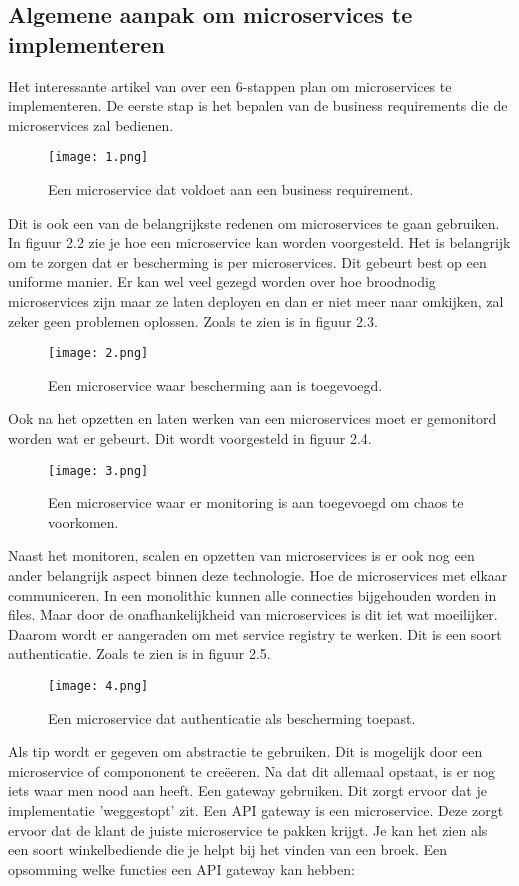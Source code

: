 \subsection{Algemene aanpak om microservices te implementeren}
Het interessante artikel van \textcite{Benetis2016} over een 6-stappen plan om microservices te implementeren.
De eerste stap is het bepalen van de business requirements die de microservices zal bedienen.
\begin{figure}[h]
	\texttt{[image: 1.png]}
	\caption{Een microservice dat voldoet aan een business requirement.}
	\centering
\end{figure} Dit is ook een van de belangrijkste redenen om microservices te gaan gebruiken. In figuur 2.2 zie je hoe een microservice kan worden voorgesteld. Het is belangrijk om te zorgen dat er bescherming is per microservices. Dit gebeurt best op een uniforme manier. Er kan wel veel gezegd worden over hoe broodnodig microservices zijn maar ze laten deployen en dan er niet meer naar omkijken, zal zeker geen problemen oplossen. Zoals te zien is in figuur 2.3.
\begin{figure}[h]
	\texttt{[image: 2.png]}
	\caption{Een microservice waar bescherming aan is toegevoegd.}
	\centering
\end{figure} Ook na het opzetten en laten werken van een microservices moet er gemonitord worden wat er gebeurt. Dit wordt voorgesteld in figuur 2.4.
\begin{figure}[h]
	\texttt{[image: 3.png]}
	\caption{Een microservice waar er monitoring is aan toegevoegd om chaos te voorkomen.}
	\centering
\end{figure}Naast het monitoren, scalen en opzetten van microservices is er ook nog een ander belangrijk aspect binnen deze technologie. Hoe de microservices met elkaar communiceren. In een monolithic kunnen alle connecties bijgehouden worden in files. Maar door de onafhankelijkheid van microservices is dit iet wat moeilijker. Daarom wordt er aangeraden om met service registry te werken. Dit is een soort authenticatie. Zoals te zien is in figuur 2.5.
\begin{figure}[h]
	\texttt{[image: 4.png]}
	\caption{Een microservice dat authenticatie als bescherming toepast.}
	\centering
\end{figure}
Als tip wordt er gegeven om abstractie te gebruiken. Dit is mogelijk door een microservice of compononent te creëeren. Na dat dit allemaal opstaat, is er nog iets waar men nood aan heeft. Een gateway gebruiken. Dit zorgt ervoor dat je implementatie 'weggestopt' zit. Een API gateway is een microservice. Deze zorgt ervoor dat de klant de juiste microservice te pakken krijgt. Je kan het zien als een soort winkelbediende die je helpt bij het vinden van een broek. Een opsomming welke functies een API gateway kan hebben:

